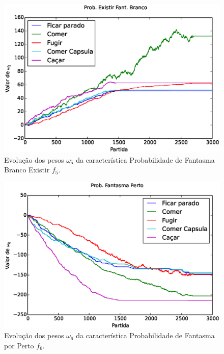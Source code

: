 \begin{figure}[H]
    \centering
    \includegraphics[width=\linewidth]{images/5_behaviors_small_map/weights____pol__ProbExistirFantBranco}
    \caption{Evolução dos pesos $ \omega_5 $ da característica Probabilidade de Fantasma Branco Existir $ f_5 $.}
    \label{img:5ComportamentosMapaPequeno:PesoProbFantasmaBrancoExistir}
\end{figure}

\begin{figure}[H]
    \centering
    \includegraphics[width=\linewidth]{images/5_behaviors_small_map/weights____pol__ProbFantasmaPerto}
    \caption{Evolução dos pesos $ \omega_6 $ da característica Probabilidade de Fantasma por Perto $ f_6 $.}
    \label{img:5ComportamentosMapaPequeno:PesoProbFantasmaPorPerto}
\end{figure}

